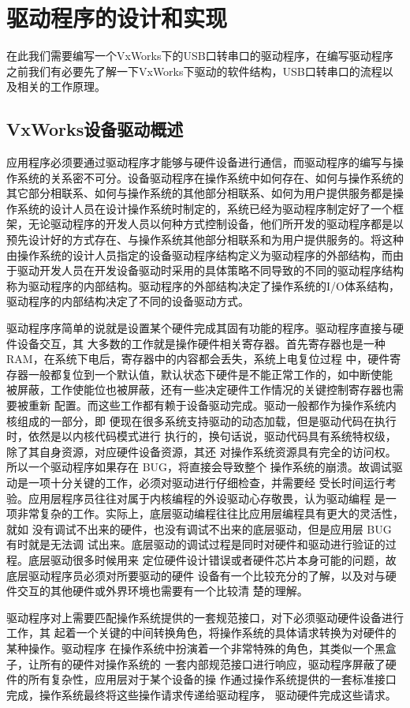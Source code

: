\chapter{驱动程序的设计和实现}
	在此我们需要编写一个VxWorks下的USB口转串口的驱动程序，在编写驱动程序之前我们有必要先了解一下VxWorks下驱动的软件结构，USB口转串口的流程以及相关的工作原理。
\section{VxWorks设备驱动概述}
	应用程序必须要通过驱动程序才能够与硬件设备进行通信，而驱动程序的编写与操作系统的关系密不可分。设备驱动程序在操作系统中如何存在、如何与操作系统的其它部分相联系、如何与操作系统的其他部分相联系、如何为用户提供服务都是操作系统的设计人员在设计操作系统时制定的，系统已经为驱动程序制定好了一个框架，无论驱动程序的开发人员以何种方式控制设备，他们所开发的驱动程序都是以预先设计好的方式存在、与操作系统其他部分相联系和为用户提供服务的。将这种由操作系统的设计人员指定的设备驱动程序结构定义为驱动程序的外部结构，而由于驱动开发人员在开发设备驱动时采用的具体策略不同导致的不同的驱动程序结构称为驱动程序的内部结构。驱动程序的外部结构决定了操作系统的I/O体系结构，驱动程序的内部结构决定了不同的设备驱动方式。
	
	驱动程序序简单的说就是设置某个硬件完成其固有功能的程序。驱动程序直接与硬件设备交互，其
大多数的工作就是操作硬件相关寄存器。首先寄存器也是一种 RAM，在系统下电后，寄存器中的内容都会丢失，系统上电复位过程
中，硬件寄存器一般都复位到一个默认值，默认状态下硬件是不能正常工作的，如中断使能
被屏蔽，工作使能位也被屏蔽，还有一些决定硬件工作情况的关键控制寄存器也需要被重新
配置。而这些工作都有赖于设备驱动完成。驱动一般都作为操作系统内核组成的一部分，即
便现在很多系统支持驱动的动态加载，但是驱动代码在执行时，依然是以内核代码模式进行
执行的，换句话说，驱动代码具有系统特权级，除了其自身资源，对应硬件设备资源，其还
对操作系统资源具有完全的访问权。所以一个驱动程序如果存在 BUG，将直接会导致整个
操作系统的崩溃。故调试驱动是一项十分关键的工作，必须对驱动进行仔细检查，并需要经
受长时间运行考验。应用层程序员往往对属于内核编程的外设驱动心存敬畏，认为驱动编程
是一项非常复杂的工作。实际上，底层驱动编程往往比应用层编程具有更大的灵活性，就如
没有调试不出来的硬件，也没有调试不出来的底层驱动，但是应用层 BUG 有时就是无法调
试出来。底层驱动的调试过程是同时对硬件和驱动进行验证的过程。底层驱动很多时候用来
定位硬件设计错误或者硬件芯片本身可能的问题，故底层驱动程序员必须对所要驱动的硬件
设备有一个比较充分的了解，以及对与硬件交互的其他硬件或外界环境也需要有一个比较清
楚的理解。
	
	驱动程序对上需要匹配操作系统提供的一套规范接口，对下必须驱动硬件设备进行工作，其
起着一个关键的中间转换角色，将操作系统的具体请求转换为对硬件的某种操作。驱动程序
在操作系统中扮演着一个非常特殊的角色，其类似一个黑盒子，让所有的硬件对操作系统的
一套内部规范接口进行响应，驱动程序屏蔽了硬件的所有复杂性，应用层对于某个设备的操
作通过操作系统提供的一套标准接口完成，操作系统最终将这些操作请求传递给驱动程序，
驱动硬件完成这些请求。	
	

